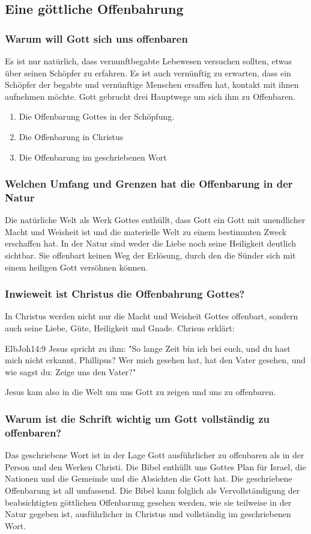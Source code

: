 \subsection{Eine göttliche Offenbahrung}
\subsubsection{Warum will Gott sich uns offenbaren}
Es ist nur natürlich, dass vernunftbegabte Lebewesen versuchen sollten, etwas über seinen Schöpfer zu erfahren. Es ist auch vernünftig zu erwarten, dass ein Schöpfer der begabte und vernünftige Menschen ersaffen hat, kontakt mit ihnen aufnehmen möchte. Gott gebrucht drei Hauptwege um sich ihm zu Offenbaren.
\begin{enumerate}
	\item Die Offenbarung Gottes in der Schöpfung.
	\item Die Offenbarung in Christus
	\item Die Offenbarung im geschriebenen Wort
\end{enumerate}
\subsubsection{Welchen Umfang und Grenzen hat die Offenbarung in der Natur}
Die natürliche Welt als Werk Gottes enthüllt, dass Gott ein Gott mit unendlicher Macht und Weisheit ist und die materielle Welt zu einem bestimmten Zweck erschaffen hat. In der Natur sind weder die Liebe noch seine Heiligkeit deutlich sichtbar. Sie offenbart keinen Weg der Erlösung, durch den die Sünder sich mit einem heiligen Gott versöhnen können.
\subsubsection{Inwieweit ist Christus die Offenbahrung Gottes?}
In Christus werden nicht nur die Macht und Weisheit Gottes offenbart, sondern auch seine Liebe, Güte, Heiligkeit und Gnade. Chrisus erklärt:
\begin{bibeltext}{Elb}{Joh}{14:9}
	Jesus spricht zu ihm: "So lange Zeit bin ich bei euch, und du hast mich nicht erkannt, Phillipus? Wer mich gesehen hat, hat den Vater gesehen, und wie sagst du: Zeige uns den Vater?"
\end{bibeltext} 
Jesus kam also in die Welt um uns Gott zu zeigen und uns zu offenbaren.
\subsubsection{Warum ist die Schrift wichtig um Gott vollständig zu offenbaren?}
Das geschriebene Wort ist in der Lage Gott ausführlicher zu offenbaren als in der Person und den Werken Christi. Die Bibel enthüllt uns Gottes Plan für Israel, die Nationen und die Gemeinde und die Absichten die Gott hat. Die geschriebene Offenbarung ist all umfassend. Die Bibel kann folglich als Vervollständigung der beabsichtigten göttlichen Offenbarung gesehen werden, wie sie teilweise in der Natur gegeben ist, ausführlicher in Christus und vollständig im geschriebenen Wort. 



